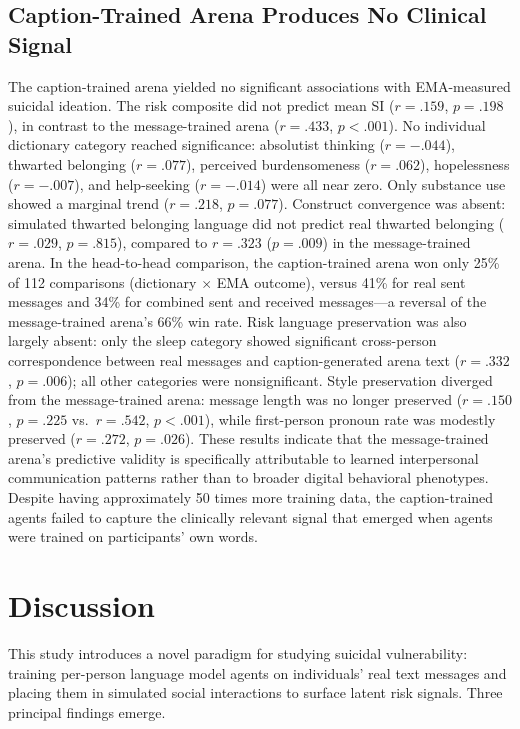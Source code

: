 \documentclass[review,12pt,authoryear]{elsarticle}
\begin{document}
\subsection{Caption-Trained Arena Produces No Clinical Signal}
 
The caption-trained arena yielded no significant associations with EMA-measured suicidal ideation. The risk composite did not predict mean SI ($r = .159$, $p = .198$), in contrast to the message-trained arena ($r = .433$, $p < .001$). No individual dictionary category reached significance: absolutist thinking ($r = -.044$), thwarted belonging ($r = .077$), perceived burdensomeness ($r = .062$), hopelessness ($r = -.007$), and help-seeking ($r = -.014$) were all near zero. Only substance use showed a marginal trend ($r = .218$, $p = .077$). Construct convergence was absent: simulated thwarted belonging language did not predict real thwarted belonging ($r = .029$, $p = .815$), compared to $r = .323$ ($p = .009$) in the message-trained arena. In the head-to-head comparison, the caption-trained arena won only 25\% of 112 comparisons (dictionary $\times$ EMA outcome), versus 41\% for real sent messages and 34\% for combined sent and received messages---a reversal of the message-trained arena's 66\% win rate. Risk language preservation was also largely absent: only the sleep category showed significant cross-person correspondence between real messages and caption-generated arena text ($r = .332$, $p = .006$); all other categories were nonsignificant. Style preservation diverged from the message-trained arena: message length was no longer preserved ($r = .150$, $p = .225$ vs.\ $r = .542$, $p < .001$), while first-person pronoun rate was modestly preserved ($r = .272$, $p = .026$). These results indicate that the message-trained arena's predictive validity is specifically attributable to learned interpersonal communication patterns rather than to broader digital behavioral phenotypes. Despite having approximately 50 times more training data, the caption-trained agents failed to capture the clinically relevant signal that emerged when agents were trained on participants' own words.


\section{Discussion}

This study introduces a novel paradigm for studying suicidal vulnerability: training per-person language model agents on individuals' real text messages and placing them in simulated social interactions to surface latent risk signals. Three principal findings emerge.
\end{document}
